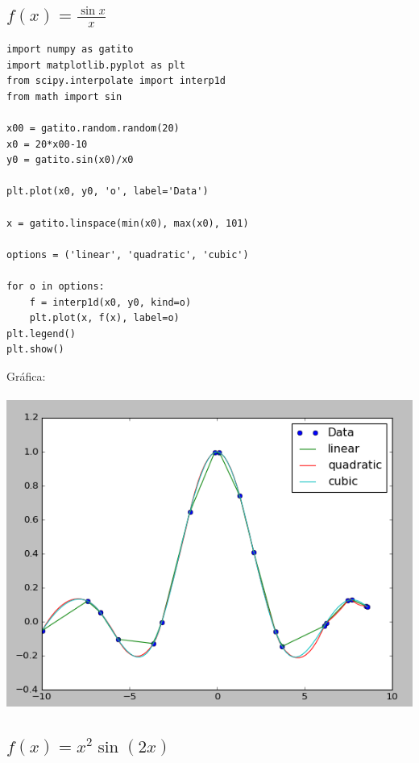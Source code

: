 \documentclass[12pt,letterpaper]{article}
\begin{document}
\subsection{$f(x) = \frac{\sin{x}}{x}$}

\begin{verbatim}
import numpy as gatito
import matplotlib.pyplot as plt
from scipy.interpolate import interp1d
from math import sin

x00 = gatito.random.random(20)
x0 = 20*x00-10
y0 = gatito.sin(x0)/x0

plt.plot(x0, y0, 'o', label='Data')

x = gatito.linspace(min(x0), max(x0), 101)

options = ('linear', 'quadratic', 'cubic')

for o in options:
    f = interp1d(x0, y0, kind=o)
    plt.plot(x, f(x), label=o)
plt.legend()
plt.show()

\end{verbatim}

Gráfica:\\
\\
\includegraphics[scale=.5]{grafica2act3.png}

\subsection{$f(x) = x^2 \sin(2x)$}
\end{document}
